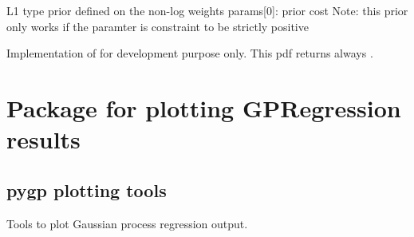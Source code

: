 \documentclass[letterpaper,10pt,english]{sphinxmanual}
\begin{document}

\begin{fulllineitems}
\label{priors:pygp.priors.lnpriors.lnL1}
L1 type prior defined on the non-log weights
params{[}0{]}: prior cost
Note: this prior only works if the paramter is constraint to be strictly positive

\end{fulllineitems}


\begin{fulllineitems}
\label{priors:pygp.priors.lnpriors.lnuniformpdf}
Implementation of  for development purpose only. This
pdf returns always \code{{[}0,0{]}}.

\end{fulllineitems}

\label{plot_gpr:module-pygp.plot}

\chapter{Package for plotting GPRegression results}
\label{plot_gpr:module-pygp.plot.gpr_plot}\label{plot_gpr::doc}\label{plot_gpr:package-for-plotting-gpregression-results}

\section{pygp plotting tools}
\label{plot_gpr:pygp-plotting-tools}
Tools to plot Gaussian process {\hyperref[gp:module-pygp.gp]{}} regression output.
\end{document}
